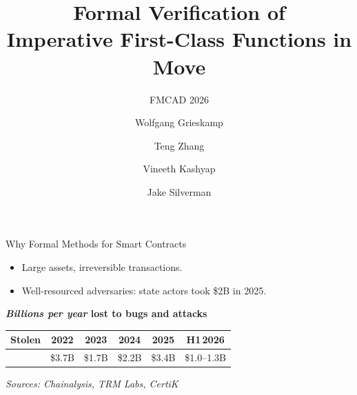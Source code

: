 \documentclass[aspectratio=169,11pt]{beamer}
\title{Formal Verification of\\Imperative First-Class Functions in Move}
\subtitle{FMCAD 2026}
\author{Wolfgang Grieskamp \and Teng Zhang \and Vineeth Kashyap \and Jake Silverman}
\institute{Aptos Labs, Palo Alto, USA}
\date{}
\begin{document}
{
  \maketitle
}

\begin{frame}{Why Formal Methods for Smart Contracts}
  \begin{itemize}
    \item Large assets, irreversible transactions.
    \item Well-resourced adversaries: state actors took \$2B in 2025.
  \end{itemize}
  \bigskip
  \begin{center}
    {\Large\textbf{\emph{Billions per year} lost to bugs and attacks}}
    \par\medskip
    \begin{tabular}{@{}lccccc@{}}
      \hline
      Stolen & 2022 & 2023 & 2024 & 2025 & H1\,2026 \\
      \hline
      & \$3.7B & \$1.7B & \$2.2B & \$3.4B & \$1.0--1.3B \\
      \hline
    \end{tabular}
    \par\smallskip
    {\footnotesize\emph{Sources: Chainalysis, TRM Labs, CertiK}}
  \end{center}
\end{frame}
\end{document}
